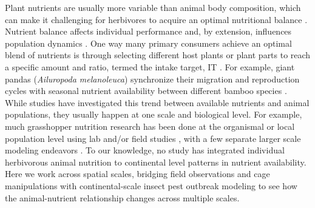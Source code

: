 \documentclass[
]{article}
\begin{document}
Plant nutrients are usually more variable than animal body composition,
which can make it challenging for herbivores to acquire an optimal
nutritional balance \citep{elser_nutritional_2000}. Nutrient balance
affects individual performance
\citep{batzli_nutritional_1986, bernays_dietary_1994} and, by extension,
influences population dynamics \citep{elser_nutritional_2000}. One way
many primary consumers achieve an optimal blend of nutrients is through
selecting different host plants or plant parts to reach a specific
amount and ratio, termed the intake target, IT \citep{simpson2012}. For
example, giant pandas (\emph{Ailuropoda melanoleuca}) synchronize their
migration and reproduction cycles with seasonal nutrient availability
between different bamboo species \citep{nie_obligate_2015}. While
studies have investigated this trend between available nutrients and
animal populations, they usually happen at one scale and biological
level. For example, much grasshopper nutrition research has been done at
the organismal or local population level using lab and/or field studies
\citep{behmer_insect_2009, cease_how_2024, le_gall_global_2019}, with a
few separate larger scale modeling endeavors
\citep{welti_nutrient_2020, zhou_increased_2019}. To our knowledge, no
study has integrated individual herbivorous animal nutrition to
continental level patterns in nutrient availability. Here we work across
spatial scales, bridging field observations and cage manipulations with
continental-scale insect pest outbreak modeling to see how the
animal-nutrient relationship changes across multiple scales.
\end{document}

